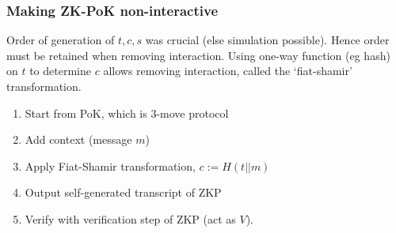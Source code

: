 \documentclass[a4paper]{scrreprt}
\begin{document}
\subsubsection{Making ZK-PoK non-interactive}

Order of generation of $t, c, s$ was crucial (else simulation possible). Hence order must be retained when removing interaction. Using one-way function (eg hash) on $t$ to determine $c$ allows removing interaction, called the `fiat-shamir' transformation.

\begin{enumerate}
	\item Start from PoK, which is 3-move protocol
	\item Add context (message $m$)
	\item Apply Fiat-Shamir transformation, $c := H(t || m)$
	\item Output self-generated transcript of ZKP
	\item Verify with verification step of ZKP (act as $V$).
\end{enumerate}
\end{document}

